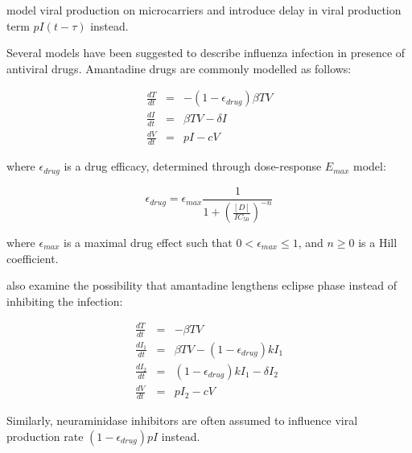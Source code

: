 \cite{mohler2005mathematical,schulze2009infection} model viral production on microcarriers and introduce delay in viral production term $p I(t - \tau)$ instead.

Several models have been suggested to describe influenza infection in presence of antiviral drugs. Amantadine drugs are commonly modelled as follows:

\begin{equation}
\begin{array}{rcl}
\frac{dT}{dt} &=& - (1-\epsilon_{drug})\beta T V \\
\frac{dI}{dt} &=& \beta T V - \delta I \\
\frac{dV}{dt} &=& p I - c V
\end{array}
\end{equation}

where $\epsilon_{drug}$ is a drug efficacy, determined through dose-response $E_{max}$ model:

\begin{equation}
\epsilon_{drug} = \epsilon_{max}\frac{1}{1 + (\frac{[D]}{IC_{50}})^{-n}}
\end{equation}

where $\epsilon_{max}$ is a maximal drug effect such that $0 < \epsilon_{max} \le 1$, and $n \ge 0$ is a Hill coefficient.

\cite{beauchemin2008modeling} also examine the possibility that amantadine lengthens eclipse phase instead of inhibiting the infection:

\begin{equation}
\begin{array}{rcl}
\frac{dT}{dt} &=& - \beta T V \\
\frac{dI_1}{dt} &=& \beta T V - (1-\epsilon_{drug}) k I_1 \\
\frac{dI_2}{dt} &=& (1-\epsilon_{drug}) k I_1 - \delta I_2 \\
\frac{dV}{dt} &=& p I_2 - c V
\end{array}
\end{equation}

Similarly, neuraminidase inhibitors are often assumed to influence viral production rate $(1-\epsilon_{drug}) p I$ instead.